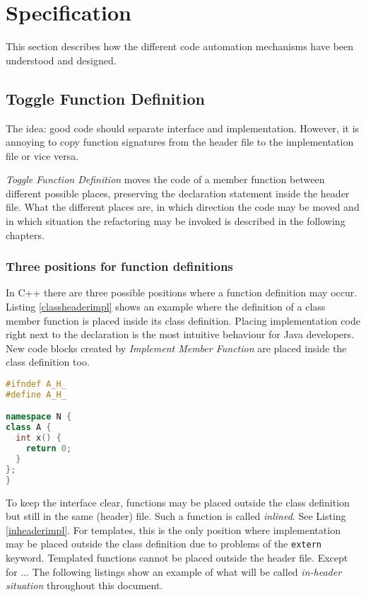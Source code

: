 \chapter{Specification}
\thispagestyle{fancy}

This section describes how the different code automation mechanisms have been
understood and designed.

\section{Toggle Function Definition}

The idea: good code should separate interface and implementation. However, it is 
annoying to copy function signatures from the header file to the implementation 
file or vice versa. 

\textit{Toggle Function Definition} moves the code of a member function between 
different possible places, preserving the declaration statement inside the 
header file. What the different places are, in which direction the code may be 
moved and in which situation the refactoring may be invoked is described in the 
following chapters. 


\subsection{Three positions for function definitions}

\label{positions}
In C++ there are three possible positions where a 
function definition may occur. Listing \ref{classheaderimpl} shows an example
where the definition of a class member function is placed inside its class
definition. Placing implementation code right next to the declaration is the
most intuitive behaviour for Java developers. New code blocks created by
\textit{Implement Member Function} are placed inside the class definition too.

\begin{lstlisting}[caption={In-class implementation in A.h},
label={classheaderimpl}, language=C++ ]
#ifndef A_H_
#define A_H_

namespace N {
class A {
  int x() {
    return 0;
  }
};
}
\end{lstlisting}

To keep the interface clear,  functions may be 
placed outside the class definition but still in the same (header) file. Such a 
function is called \textit{inlined}. See Listing \ref{inheaderimpl}. For
templates, this is the only position where implementation may be placed outside
the class definition due to problems of the \texttt{extern} keyword. Templated
functions cannot be placed outside the header file. Except for ... 
The following listings show an example of what will be called 
\textit{in-header situation} throughout this document.

